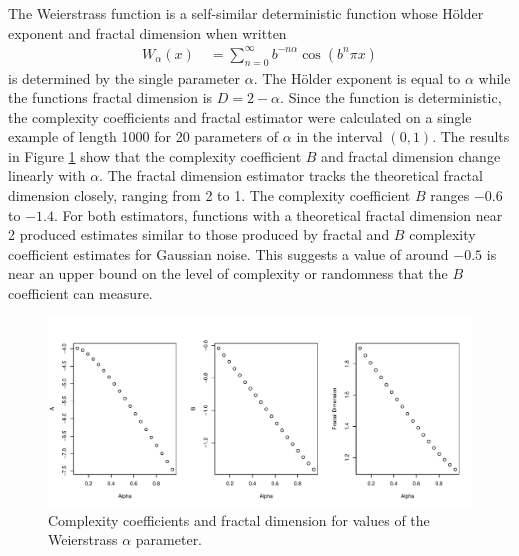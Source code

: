 The Weierstrass function is a self-similar 
deterministic function 
whose H\"older exponent and fractal dimension when 
written
\begin{align}
      W_{\alpha}(x) 
  \hspace{1em}= \sum_{n = 0}^{\infty} b^{-n \alpha} \cos(b^n \pi x)
\end{align}
is determined by the single parameter $\alpha$. The 
H\"older exponent is equal to $\alpha$ while the functions
fractal dimension is $D = 2 - \alpha$. 
Since the function is deterministic, the complexity 
coefficients and fractal estimator were calculated 
on a single example of length 1000 for 20 parameters 
of $\alpha$ in the interval $(0,1)$. The results 
in Figure \ref{fig:notrandom-params}  
show that the complexity coefficient $B$ and fractal dimension
change linearly with $\alpha$. The fractal dimension 
estimator tracks the theoretical fractal dimension 
closely, ranging from 2 to 1. The complexity coefficient 
$B$ ranges $-0.6$ to $-1.4$. For both estimators, 
functions with a theoretical
fractal dimension near 2 produced estimates similar 
to those produced by fractal and $B$ complexity 
coefficient estimates for Gaussian noise. This suggests 
a value of around $-0.5$ is near an upper bound on 
the level of complexity or randomness that the $B$ 
coefficient can measure.


\begin{figure}[!htbp]
  \begin{center}
  \includegraphics[width = \textwidth, keepaspectratio]{./figs/holder_notrandom-param-plots-notrandom}
  \end{center} 
  \caption{Complexity coefficients and fractal dimension 
    for values of the Weierstrass $\alpha$ parameter.  }
  \label{fig:notrandom-params}
\end{figure}

